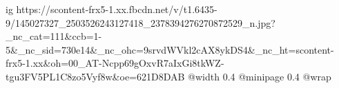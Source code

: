  
 
 
 
 

\ifcmt
  ig https://scontent-frx5-1.xx.fbcdn.net/v/t1.6435-9/145027327_2503526243127418_2378394276270872529_n.jpg?_nc_cat=111&ccb=1-5&_nc_sid=730e14&_nc_ohc=9srvdWVkl2cAX8ykDS4&_nc_ht=scontent-frx5-1.xx&oh=00_AT-Ncpp69gOxvR7aIxGi8tkWZ-tgu3FV5PL1C8zo5Vyf8w&oe=621D8DAB
  @width 0.4
  @minipage 0.4
  @wrap \parpic[r]
\fi
